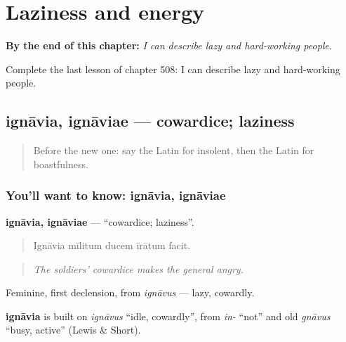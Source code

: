 
\chapter{Laziness and energy}
\label{ch:la-laziness-and-energy}

\begin{chapteropening}
\textbf{By the end of this chapter:} \emph{I can describe lazy and hard-working people.}

Complete the last lesson of chapter 508: I can describe lazy and hard-working people.
\end{chapteropening}

\section[ignāvia, ignāviae]{ignāvia, ignāviae — cowardice; laziness}

\label{lesson:LA-C508-ignavia}



\begin{quote}
Before the new one: say the Latin for insolent, then the Latin for boastfulness.
\end{quote}

\subsection*{You'll want to know: ignāvia, ignāviae}
\textbf{ignāvia, ignāviae} — \textquotedblleft{}cowardice; laziness\textquotedblright{}.

\begin{quote}
Ignāvia mīlitum ducem īrātum facit.
\end{quote}

\begin{quote}
\emph{The soldiers' cowardice makes the general angry.}
\end{quote}

Feminine, first declension, from \emph{ignāvus} — lazy, cowardly.

\begin{cousinweb}
\textbf{ignāvia} is built on \emph{ignāvus} \textquotedblleft{}idle, cowardly\textquotedblright{}, from \emph{in-} \textquotedblleft{}not\textquotedblright{} and old \emph{gnāvus} \textquotedblleft{}busy, active\textquotedblright{} (Lewis \& Short).
\end{cousinweb}

